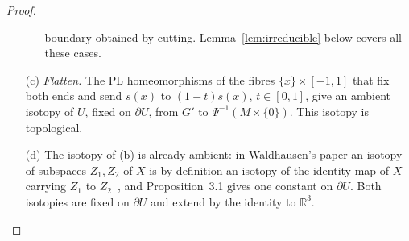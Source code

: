 \documentclass[preprint,12pt]{elsarticle}
\theoremstyle{definition}
\theoremstyle{remark}
\newcommand{\R}{\mathbb{R}}
\begin{document}
\begin{proof}
\begin{enumerate}
\begin{itemize}
  boundary obtained by cutting. Lemma~\ref{lem:irreducible} below covers all these cases.
  \end{itemize}
\item[(c)] \emph{Flatten.} The PL homeomorphisms of the fibres $\{x\}\times[-1,1]$ that fix both ends and send $s(x)$
to $(1-t)s(x)$, $t\in[0,1]$, give an ambient isotopy of $U$, fixed on $\partial U$, from $G'$ to
$\Psi^{-1}(M\times\{0\})$. This isotopy is topological.
\item[(d)] The isotopy of (b) is already ambient: in Waldhausen's paper an isotopy of subspaces $Z_1,Z_2$ of $X$ is by
definition an isotopy of the identity map of $X$ carrying $Z_1$ to $Z_2$~\cite[p.~57]{Waldhausen68}, and Proposition~3.1
gives one constant on $\partial U$. Both isotopies are fixed on $\partial U$ and extend by the identity to $\R^3$.
\end{enumerate}
\end{proof}
\end{document}
